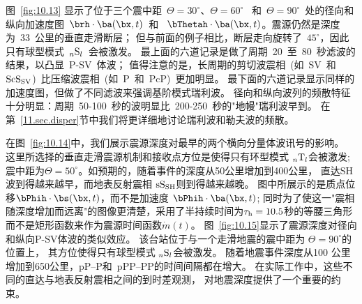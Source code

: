 图~\ref{fig:10.13} 显示了位于三个震中距~$\Theta=30^\circ$、$\Theta=60^\circ$
~和~$\Theta=90^\circ$~处的径向和纵向加速度图~$\brh\cdot\ba(\bx,t)$~和 ~$\bThetah\cdot\ba(\bx,t)$。震源仍然是深度为~33~公里的垂直走滑断层；
但与前面的例子相比，断层走向旋转了~$45^{\circ}$，因此只有球型模式~${}_n{\rm S}_l$~会被激发。
最上面的六道记录是做了周期~20~至~80~秒滤波的结果，以凸显~P-SV~体波；
值得注意的是，长周期的剪切波震相~(如~SV~和~${\rm ScS}_{\rm SV}$)~比压缩波震相~(如~P~和~PcP)~更加明显。
最下面的六道记录显示同样的加速度图，但做了不同滤波来强调基阶模式瑞利波。
径向和纵向波列的频散特征十分明显：周期~50-100~秒的波明显比~200-250~秒的"地幔"瑞利波早到。
在第~\ref{11.sec.disper}节中我们将更详细地讨论瑞利波和勒夫波的频散。

在图~\ref{fig:10.14}中，我们展示震源深度对最早的两个横向分量体波讯号的影响。
这里所选择的垂直走滑震源机制和接收点方位是使得只有环型模式 ${}_n{\rm T}_l$会被激发; 震中距为$\Theta=50^\circ$。如预期的，随着事件的深度从50公里增加到400公里，
直达SH波到得越来越早，而地表反射震相 ${\rm sS}_{\rm SH}$则到得越来越晚。
图中所展示的是质点位移$\bPhih\cdot\bs(\bx,t)$，而不是加速度 $\bPhih\cdot\ba(\bx,t)$;
同时为了使这一"震相随深度增加而远离"的图像更清楚，采用了半持续时间为$\tau_{\rm h}=10.5$秒的等腰三角形而不是矩形函数来作为震源时间函数$\dot{m}(t)$。
图~\ref{fig:10.15}显示了震源深度对径向和纵向P-SV体波的类似效应。
该台站位于与一个走滑地震的震中距为 $\Theta=90^\circ$的位置上，
其方位使得只有球型模式 ${}_n{\rm S}_l$会被激发。
随着地震事件深度从100 公里增加到650公里，pP--P和~pPP--PP的时间间隔都在增大。
在实际工作中，这些不同的直达与地表反射震相之间的到时差观测，
对地震深度提供了一个重要的约束。
%

